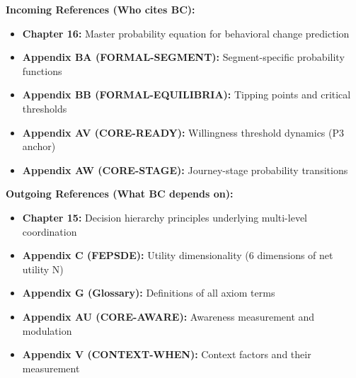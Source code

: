 \documentclass[11pt, a4paper]{article}
\begin{document}
\begin{tcolorbox}[colback=cyan!5!white, colframe=cyan!75!black, title=Cross-Reference Map]
\textbf{Incoming References (Who cites BC):}
\begin{itemize}[nosep]
    \item \textbf{Chapter 16:} Master probability equation for behavioral change prediction
    \item \textbf{Appendix BA (FORMAL-SEGMENT):} Segment-specific probability functions
    \item \textbf{Appendix BB (FORMAL-EQUILIBRIA):} Tipping points and critical thresholds
    \item \textbf{Appendix AV (CORE-READY):} Willingness threshold dynamics (P3 anchor)
    \item \textbf{Appendix AW (CORE-STAGE):} Journey-stage probability transitions
\end{itemize}

\textbf{Outgoing References (What BC depends on):}
\begin{itemize}[nosep]
    \item \textbf{Chapter 15:} Decision hierarchy principles underlying multi-level coordination
    \item \textbf{Appendix C (FEPSDE):} Utility dimensionality (6 dimensions of net utility N)
    \item \textbf{Appendix G (Glossary):} Definitions of all axiom terms
    \item \textbf{Appendix AU (CORE-AWARE):} Awareness measurement and modulation
    \item \textbf{Appendix V (CONTEXT-WHEN):} Context factors and their measurement
\end{itemize}
\end{tcolorbox}

\end{document}
